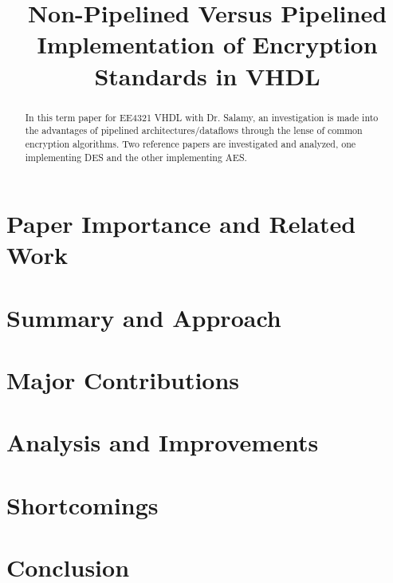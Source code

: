 \documentclass[journal,twocolumn]{IEEEtran}
\begin{document}
\title{Non-Pipelined Versus Pipelined Implementation of Encryption Standards in
VHDL} 
\author{
}

%
{}

\maketitle

\begin{abstract}
In this term paper for EE4321 VHDL with Dr. Salamy, an investigation is made 
into the advantages of pipelined architectures/dataflows through the lense of
common encryption algorithms. Two reference papers are investigated and 
analyzed, one implementing DES and the other implementing AES.
\end{abstract}

\section{Paper Importance and Related Work}

\section{Summary and Approach}

\section{Major Contributions}


\section{Analysis and Improvements}

\section{Shortcomings}

\section{Conclusion}



\end{document}
